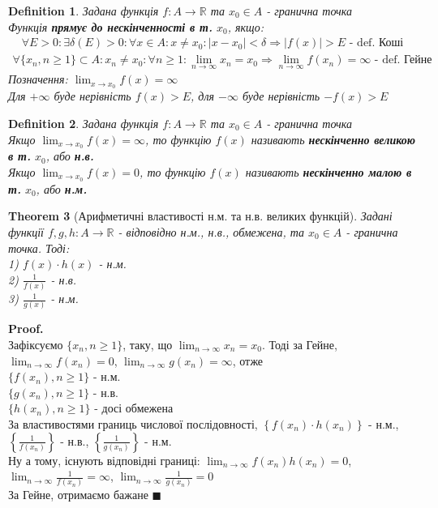 \documentclass[a4paper, 14pt]{extarticle}
\def\huge{\displaystyle}
\theoremstyle{theoremdd}
\newtheorem{theorem}{Theorem}[subsection]
\theoremstyle{theoremdd}
\newtheorem{definition}[theorem]{Definition}
\theoremstyle{theoremdd}
\theoremstyle{theoremdd}
\theoremstyle{theoremdd}
\theoremstyle{theoremdd}
\theoremstyle{theoremdd}
\theoremstyle{theoremdd}
\newenvironment{pf}{\vspace*{-3mm} \textbf{Proof. \\}}{$\blacksquare$}
\begin{document}
	\begin{definition}
	Задана функція $f: A \to \mathbb{R}$ та $x_0 \in A$ - гранична точка\\
	Функція \textbf{прямує до нескінченності в т.} $x_0$, якщо:
	\begin{align*}
	\forall E > 0: \exists \delta(E) > 0: \forall x \in A: x \neq x_0: |x-x_0|<\delta \Rightarrow |f(x)|>E \textrm{ - def. Коші}
	\end{align*}
	\begin{align*}
	\forall \{x_n, n \geq 1\}\subset A: x_n \neq x_0: \forall n \geq 1: \lim_{n \to \infty} x_n = x_0 \Rightarrow \lim_{n \to \infty} f(x_n) = \infty \textrm{ - def. Гейне}
	\end{align*}
	Позначення: $\huge \lim_{x \to x_0} f(x) = \infty$\\
	Для $+\infty$ буде нерівність $f(x) > E$, для $-\infty$ буде нерівність $-f(x) > E$
	\end{definition}
	
	\begin{definition}
	Задана функція $f: A \to \mathbb{R}$ та $x_0 \in A$ - гранична точка \\
	Якщо $\huge \lim_{x \to x_0} f(x) = \infty$, то функцію $f(x)$ називають \textbf{нескінченно великою в т.} $x_0$, або \textbf{н.в.}\\
	Якщо $\huge \lim_{x \to x_0} f(x) = 0$, то функцію $f(x)$ називають \textbf{нескінченно малою в т.} $x_0$, або \textbf{н.м.}
	\end{definition}
	
	\begin{theorem}[Арифметичні властивості н.м. та н.в. великих функцій]
	Задані функції $f,g,h: A \to \mathbb{R}$ - відповідно н.м., н.в., обмежена, та $x_0 \in A$ - гранична точка. Тоді:\\
	1) $f(x) \cdot h(x)$ - н.м.\\
	2) $\huge \frac{1}{f(x)}$ - н.в.\\
	3) $\huge \frac{1}{g(x)}$ - н.м.\\
	\end{theorem}
	
	\begin{pf}
	Зафіксуємо $\{x_n, n \geq 1\}$, таку, що $\huge \lim_{n \to \infty} x_n = x_0$. Тоді за Гейне, \\ $\huge \lim_{n \to \infty} f(x_n) = 0$, $\huge \lim_{n \to \infty} g(x_n) = \infty$, отже\\
	$\{f(x_n), n \geq 1\}$ - н.м.\\
	$\{g(x_n), n \geq 1\}$ - н.в.\\
	$\{h(x_n), n \geq 1\}$ - досі обмежена\\
	За властивостями границь числової послідовності, $\left\{f(x_n) \cdot h(x_n) \right\}$ - н.м., $\left\{ \huge \frac{1}{f(x_n)} \right\}$ - н.в., $\left\{ \huge \frac{1}{g(x_n)} \right\}$ - н.м.\\
	Ну а тому, існують відповідні границі: $\huge \lim_{n \to \infty} f(x_n) h(x_n) = 0$, \\ $\huge \lim_{n \to \infty} \frac{1}{f(x_n)} = \infty$, $\huge \lim_{n \to \infty} \frac{1}{g(x_n)} = 0$\\
	За Гейне, отримаємо бажане
	\end{pf}
	
\end{document}
